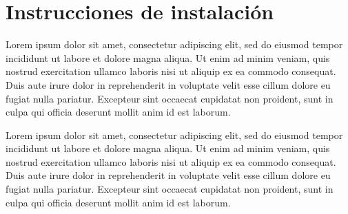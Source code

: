 \chapter{Instrucciones de instalación}\label{ch:appendix_2}

Lorem ipsum dolor sit amet, consectetur adipiscing elit, sed do eiusmod tempor incididunt ut labore et dolore magna
aliqua. Ut enim ad minim veniam, quis nostrud exercitation ullamco laboris nisi ut aliquip ex ea commodo consequat. Duis
aute irure dolor in reprehenderit in voluptate velit esse cillum dolore eu fugiat nulla pariatur. Excepteur sint
occaecat cupidatat non proident, sunt in culpa qui officia deserunt mollit anim id est laborum.

Lorem ipsum dolor sit amet, consectetur adipiscing elit, sed do eiusmod tempor incididunt ut labore et dolore magna
aliqua. Ut enim ad minim veniam, quis nostrud exercitation ullamco laboris nisi ut aliquip ex ea commodo consequat. Duis
aute irure dolor in reprehenderit in voluptate velit esse cillum dolore eu fugiat nulla pariatur. Excepteur sint
occaecat cupidatat non proident, sunt in culpa qui officia deserunt mollit anim id est laborum.
